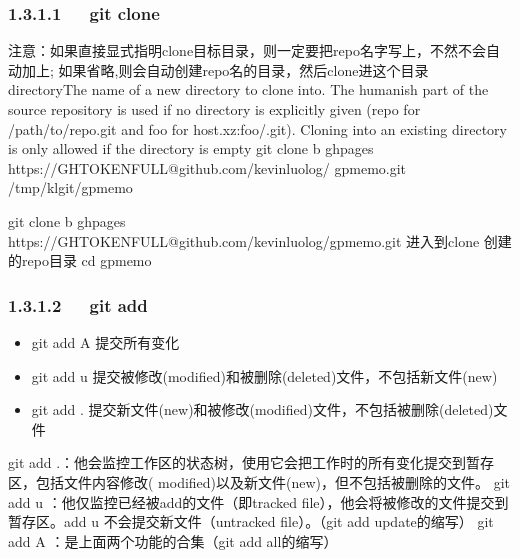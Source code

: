 \documentclass[letterpaper,12pt,english]{sphinxmanual}
\begin{document}
\subsubsection{1.3.1.1   git clone}
\label{\detokenize{001software/001install/001._u7f51_u7ad9/github:git-clone}}
\begin{sphinxVerbatim}[commandchars=\\\{\}]
\PYGZsh{} 注意：如果直接显式指明clone目标目录，则一定要把repo名字写上，不然不会自动加上;   如果省略,则会自动创建repo名的目录，然后clone进这个目录
\PYGZsh{} \PYGZlt{}directory\PYGZgt{}The name of a new directory to clone into. The \PYGZdq{}humanish\PYGZdq{}    part of the source repository is used if no directory is explicitly given    (repo for /path/to/repo.git and foo for host.xz:foo/.git). Cloning into    an existing directory is only allowed if the directory is empty  \PYGZsh{}\PYGZhy{} git    clone \PYGZhy{}b gh\PYGZhy{}pages https://\PYGZdl{}GH\PYGZus{}TOKEN\PYGZus{}FULL@github.com/kevinluolog/   gp\PYGZhy{}memo.git /tmp/klgit/gp\PYGZhy{}memo

  \PYGZhy{} git clone \PYGZhy{}b gh\PYGZhy{}pages https://\PYGZdl{}GH\PYGZus{}TOKEN\PYGZus{}FULL@github.com/kevinluolog/gp\PYGZhy{}memo.git
\PYGZsh{} 进入到clone 创建的repo目录
  \PYGZhy{} cd gp\PYGZhy{}memo
\end{sphinxVerbatim}


\subsubsection{1.3.1.2   git add}
\label{\detokenize{001software/001install/001._u7f51_u7ad9/github:git-add}}\begin{itemize}
\item {} 
git add \sphinxhyphen{}A  提交所有变化

\item {} 
git add \sphinxhyphen{}u  提交被修改(modified)和被删除(deleted)文件，不包括新文件(new)

\item {} 
git add .  提交新文件(new)和被修改(modified)文件，不包括被删除(deleted)文件

\end{itemize}

\begin{sphinxVerbatim}[commandchars=\\\{\}]
git add .：他会监控工作区的状态树，使用它会把工作时的所有变化提交到暂存区，包括文件内容修改(   modified)以及新文件(new)，但不包括被删除的文件。
git add \PYGZhy{}u ：他仅监控已经被add的文件（即tracked    file），他会将被修改的文件提交到暂存区。add \PYGZhy{}u 不会提交新文件（untracked    file）。（git add \PYGZhy{}\PYGZhy{}update的缩写）
git add \PYGZhy{}A ：是上面两个功能的合集（git add \PYGZhy{}\PYGZhy{}all的缩写）
\end{sphinxVerbatim}
\end{document}
